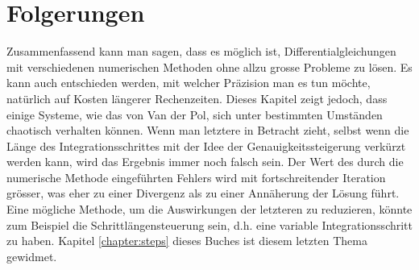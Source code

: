 %
%
%
\section{Folgerungen
\label{vanderpol:section:folgerungen}}
Zusammenfassend kann man sagen, dass es möglich ist, Differentialgleichungen mit verschiedenen numerischen Methoden ohne allzu grosse Probleme zu lösen. Es kann auch entschieden werden, mit welcher Präzision man es tun möchte, natürlich auf Kosten längerer Rechenzeiten. Dieses Kapitel zeigt jedoch, dass einige Systeme, wie das von Van der Pol, sich unter bestimmten Umständen chaotisch verhalten können. Wenn man letztere in Betracht zieht, selbst wenn die Länge des Integrationsschrittes mit der Idee der Genauigkeitssteigerung verkürzt werden kann, wird das Ergebnis immer noch falsch sein. Der Wert des durch die numerische Methode eingeführten Fehlers wird mit fortschreitender Iteration grösser, was eher zu einer Divergenz als zu einer Annäherung der Lösung führt. Eine mögliche Methode, um die Auswirkungen der letzteren zu reduzieren, könnte zum Beispiel die Schrittlängensteuerung sein, d.h. eine variable Integrationsschritt zu haben. Kapitel \ref{chapter:steps} dieses Buches ist diesem letzten Thema gewidmet. 
%
